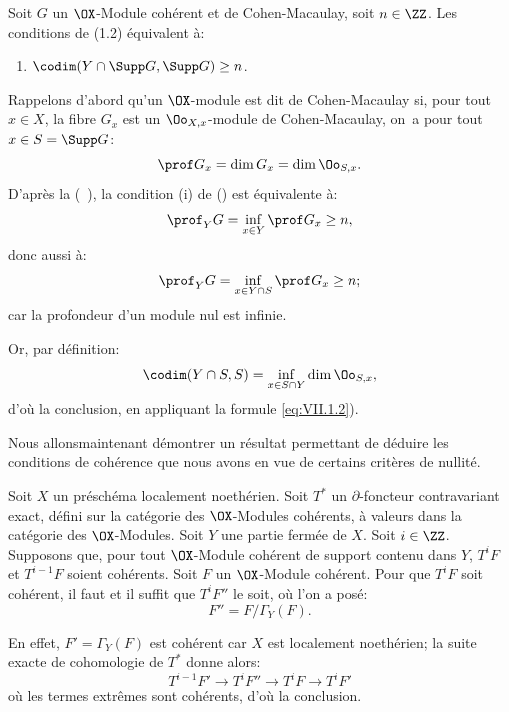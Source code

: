 \begin{corollaire}\label{VII.1.4}
Soit $G$ un $\OX$-Module coh\'erent et de Cohen-Macaulay, soit $n \in \ZZ$. Les conditions de \textup{(1.2)} \'equivalent \`a:
\begin{enumerate}
\item[\textup{(v)}]\hfill$\codim(Y \cap \Supp G, \Supp G) \geq n$.\hfill\null
\end{enumerate}
\end{corollaire}
\setcounter{equation}{1}
Rappelons d'abord qu'un $\OX$-module est dit de Cohen-Macaulay si, pour tout $x \in X$, la fibre $G_x$ est un $\Oo_{X, x}$-module de Cohen-Macaulay, \ie on~a pour tout $x \in S = \Supp G$:
\begin{equation}\label{eq:VII.1.2}
\prof G_x = \dim G_x = \dim \Oo_{S, x}.
\end{equation}
D'apr\`es la (~), la condition (i) de () est \'equivalente \`a:
\begin{equation}\label{eq:VII.1.3} \prof_Y G = \inf_{x\in Y} \prof G_x \geq n,
\end{equation}
donc aussi \`a:
\[
\prof_Y G = \inf_{x \in Y \cap S} \prof G_x \geq n;
\]
car la profondeur d'un module nul est infinie.

Or, par d\'efinition:
\[
\codim (Y \cap S, S) = \inf_{x \in S \cap Y} \dim \Oo_{S, x},
\]
d'o\`u la conclusion, en appliquant la formule \eqref{eq:VII.1.2}).

Nous allons\pageoriginale maintenant d\'emontrer un r\'esultat permettant de d\'eduire les conditions de coh\'erence que nous avons en vue de certains crit\`eres de nullit\'e.

\begin{lemme}\label{VII.1.5}
Soit $X$ un pr\'esch\'ema localement noeth\'erien. Soit $T^{\ast}$ un $\partial$-foncteur contravariant exact, d\'efini sur la cat\'egorie des $\OX$-Modules coh\'erents, \`a valeurs dans la cat\'egorie des $\OX$-Modules. Soit $Y$ une partie ferm\'ee de $X$. Soit $i \in \ZZ$. Supposons que, pour tout $\OX$-Module coh\'erent de support contenu dans $Y$, $T^i F$ et $T^{i-1} F$ soient coh\'erents. Soit $F$ un $\OX$-Module coh\'erent. Pour que $T^i F$ soit coh\'erent, il faut et il suffit que $T^i F''$ le soit, o\`u l'on a pos\'e:
\[
F'' = F / \Gamma_Y (F).
\]
\end{lemme}

En effet, $F' = \Gamma_Y (F)$ est coh\'erent car $X$ est localement noeth\'erien; la suite exacte de cohomologie de $T^{\ast}$ donne alors:
\[
T^{i-1}F' \to T^i F'' \to T^i F \to T^i F'
\]
o\`u les termes extr\^emes sont coh\'erents, d'o\`u la conclusion.

